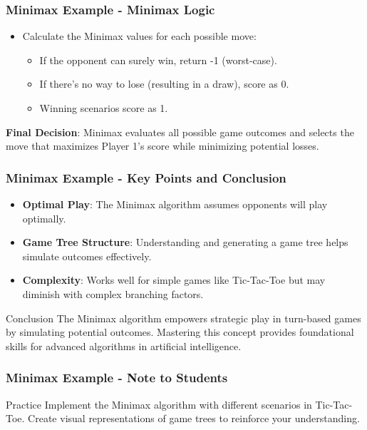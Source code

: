 \documentclass[aspectratio=169]{beamer}
\begin{document}
\begin{frame}[fragile]
    \frametitle{Minimax Example - Minimax Logic}
    \begin{itemize}
        \item Calculate the Minimax values for each possible move:
        \begin{itemize}
            \item If the opponent can surely win, return -1 (worst-case).
            \item If there's no way to lose (resulting in a draw), score as 0.
            \item Winning scenarios score as 1.
        \end{itemize}
    \end{itemize}
    
    \textbf{Final Decision}: Minimax evaluates all possible game outcomes and selects the move that maximizes Player 1's score while minimizing potential losses.
\end{frame}

\begin{frame}[fragile]
    \frametitle{Minimax Example - Key Points and Conclusion}
    \begin{itemize}
        \item \textbf{Optimal Play}: The Minimax algorithm assumes opponents will play optimally.
        \item \textbf{Game Tree Structure}: Understanding and generating a game tree helps simulate outcomes effectively.
        \item \textbf{Complexity}: Works well for simple games like Tic-Tac-Toe but may diminish with complex branching factors.
    \end{itemize}
    
    \begin{block}{Conclusion}
        The Minimax algorithm empowers strategic play in turn-based games by simulating potential outcomes. Mastering this concept provides foundational skills for advanced algorithms in artificial intelligence.
    \end{block}
\end{frame}

\begin{frame}[fragile]
    \frametitle{Minimax Example - Note to Students}
    \begin{block}{Practice}
        Implement the Minimax algorithm with different scenarios in Tic-Tac-Toe. Create visual representations of game trees to reinforce your understanding.
    \end{block}
\end{frame}
\end{document}
